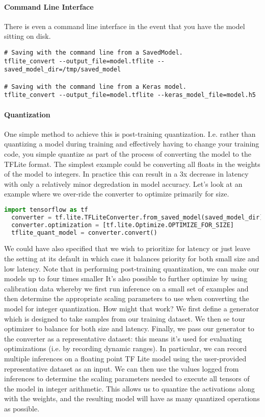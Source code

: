\documentclass[12pt]{article}
\begin{document}
\paragraph{Command Line Interface} There is even a command line interface in the event that you have the model sitting on disk.
\begin{verbatim}
# Saving with the command line from a SavedModel.
tflite_convert --output_file=model.tflite --saved_model_dir=/tmp/saved_model

# Saving with the command line from a Keras model.
tflite_convert --output_file=model.tflite --keras_model_file=model.h5
\end{verbatim}

\paragraph{Quantization} One simple method to achieve this is post-training quantization. I.e. rather than quantizing a model during training and effectively having to change your training code, you simple quantize as part of the process of converting the model to the TFLite format. The simplest example could be converting all floats in the weights of the model to integers. In practice this can result in a 3x decrease in latency with only a relatively minor degredation in model accuracy. Let's look at an example where we over-ride the converter to optimize primarily for size.
\begin{lstlisting}[language=Python]
  import tensorflow as tf
  converter = tf.lite.TFLiteConverter.from_saved_model(saved_model_dir)
  converter.optimization = [tf.lite.Optimize.OPTIMIZE_FOR_SIZE]
  tflite_quant_model = converter.convert()
\end{lstlisting}
We could have also specified that we wish to prioritize for latency or just leave the setting at its default in which case it balances priority for both small size and low latency. Note that in performing post-training quantization, we can make our models up to four times smaller It's also possible to further optimize by using calibration data whereby we first run inference on a small set of examples and then determine the appropriate scaling parameters to use when converting the model for integer quantization. How might that work? We first define a generator which is designed to take samples from our training dataset. We then se tour optimizer to balance for both size and latency. Finally, we pass our generator to the converter as a representative dataset: this means it's used for evaluating optimizations (i.e. by recording dynamic ranges). In particular, we can record multiple inferences on a floating point TF Lite model using the user-provided representative dataset as an input. We can then use the values logged from inferences to determine the scaling parameters needed to execute all tensors of the model in integer arithmetic. This allows us to quantize the activations along with the weights, and the resulting model will have as many quantized operations as possible. 
\end{document}
